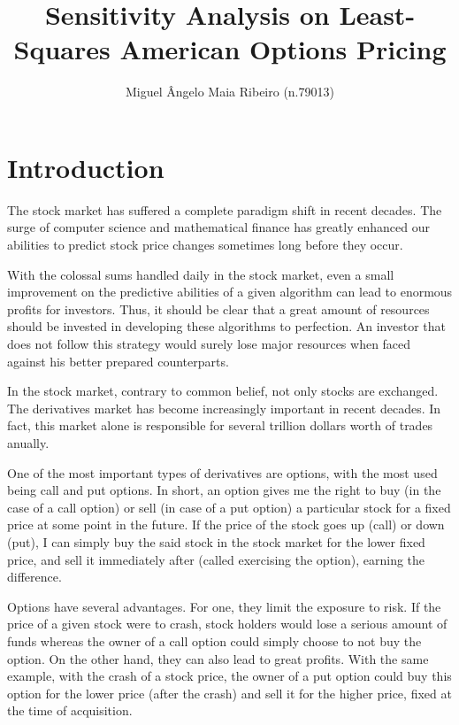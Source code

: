 \documentclass[a4paper,prd,nofootinbib,superscriptaddress,floatfix]{revtex4}
\begin{document}
\title{Sensitivity Analysis on Least-Squares American Options Pricing}

\author{Miguel Ângelo Maia Ribeiro (n.79013)}




\maketitle
\section{Introduction}
The stock market has suffered a complete paradigm shift in recent decades. The surge of computer science and mathematical finance has greatly enhanced our abilities to predict stock price changes sometimes long before they occur.

With the colossal sums handled daily in the stock market, even a small improvement on the predictive abilities of a given algorithm can lead to enormous profits for investors. Thus, it should be clear that a great amount of resources should be invested in developing these algorithms to perfection. An investor that does not follow this strategy would surely lose major resources when faced against his better prepared counterparts.

In the stock market, contrary to common belief, not only stocks are exchanged. The derivatives market has become increasingly important in recent decades. In fact, this market alone is responsible for several trillion dollars worth of trades anually.

One of the most important types of derivatives are options, with the most used being call and put options. In short, an option gives me the right to buy (in the case of a call option) or sell (in case of a put option) a particular stock for a fixed price at some point in the future. If the price of the stock goes up (call) or down (put), I can simply buy the said stock in the stock market for the lower fixed price, and sell it immediately after (called exercising the option), earning the difference.

Options have several advantages. For one, they limit the exposure to risk. If the price of a given stock were to crash, stock holders would lose a serious amount of funds whereas the owner of a call option could simply choose to not buy the option. On the other hand, they can also lead to great profits. With the same example, with the crash of a stock price, the owner of a put option could buy this option for the lower price (after the crash) and sell it for the higher price, fixed at the time of acquisition.
\end{document}
